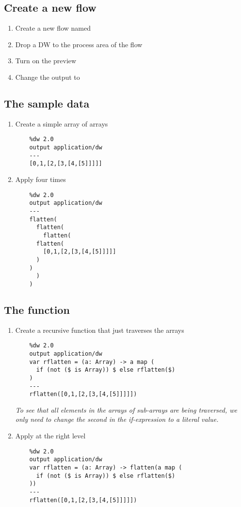 \subsection{Create a new flow}
\begin{enumerate}
\item Create a new flow named 
\item Drop a DW to the process area of the flow
\item Turn on the preview
\item Change the output to 
\end{enumerate}

\subsection{The sample data}
\begin{enumerate}[resume*]
\item Create a simple array of arrays
  \begin{lstlisting}
    %dw 2.0
    output application/dw
    ---
    [0,1,[2,[3,[4,[5]]]]]
  \end{lstlisting}
\item Apply  four times
  \begin{lstlisting}
    %dw 2.0
    output application/dw
    ---
    flatten(
      flatten(
        flatten(
	  flatten(
	    [0,1,[2,[3,[4,[5]]]]]
	  )
	)
      )
    )
  \end{lstlisting}
\end{enumerate}

\subsection{The  function}
\begin{enumerate}[resume*]
\item Create a recursive function that just traverses the arrays
  \begin{lstlisting}
    %dw 2.0
    output application/dw
    var rflatten = (a: Array) -> a map (
      if (not ($ is Array)) $ else rflatten($)
    )
    ---
    rflatten([0,1,[2,[3,[4,[5]]]]])
  \end{lstlisting}
  \emph{
    To see that all elements in the arrays of sub-arrays are being traversed, we only need to change the second \ttt{\$} in the if-expression to a literal value.
  }
\item Apply  at the right level
  \begin{lstlisting}
    %dw 2.0
    output application/dw
    var rflatten = (a: Array) -> flatten(a map (
      if (not ($ is Array)) $ else rflatten($)
    ))
    ---
    rflatten([0,1,[2,[3,[4,[5]]]]])
  \end{lstlisting}
\end{enumerate}

